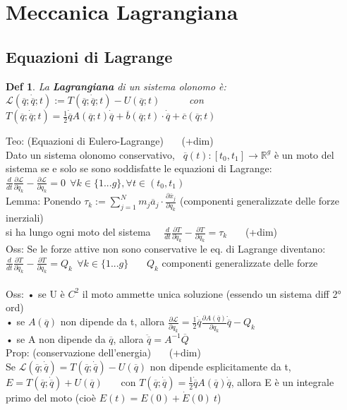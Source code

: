 \documentclass{article}
\theoremstyle{unnumbered}
\newtheorem* {theoremT}{Def}
\theoremstyle{unnumbered1}
\newenvironment{defi}{\begin{gBox}\begin{theoremT}}{\end{theoremT}\end{gBox}}
\begin{document}
\section{Meccanica Lagrangiana}


\subsection{Equazioni di Lagrange}
%
\begin{defi}
La \textbf{Lagrangiana} di un sistema olonomo è:\\
\phantom{DEF: } $\mathcal{L}(\overline{q};\dot{\overline{q}};t):=T(\overline{q};\dot{\overline{q}};t) - U(\overline{q};t)$ \ \ \ \ \ con $T(\overline{q};\dot{\overline{q}};t)=\frac{1}{2}\dot{\overline{q}}A(\overline{q};t)\dot{\overline{q}} + \overline{b}(\overline{q};t)\cdot\dot{\overline{q}} + \overline{c}(\overline{q};t)$
\end{defi}
%
%
Teo: (Equazioni di Eulero-Lagrange) \ \ \ (+dim)\\
Dato un sistema olonomo conservativo, \ $\overline{q}(t):[t_0,t_1]\rightarrow\mathbb{R}^g$ è un moto del sistema se e solo se sono soddisfatte le equazioni di Lagrange:  \ \ \ \ \ $\frac{d}{dt}\frac{\partial\mathcal{L}}{\partial\dot{q}_k} - \frac{\partial\mathcal{L}}{\partial q_k} = 0 \ \ \forall k \in \{1...g\}, \forall t \in (t_0,t_1) $\\
%
Lemma: Ponendo $\tau_k:=\sum_{j=1}^N m_j\overline{a}_j \cdot \frac{\partial \overline{x}_j}{\partial q_k} $ (componenti generalizzate delle forze inerziali)  \\
\phantom{Lemma: } si ha lungo ogni moto del sistema \ \ $\frac{d}{dt}\frac{\partial T}{\partial\dot{q}_k} - \frac{\partial T}{\partial q_k} = \tau_k$  \ \ \ (+dim)\\
%
Oss: Se le forze attive non sono conservative le eq. \! di Lagrange diventano:  \\
\phantom{Oss: }$\frac{d}{dt}\frac{\partial T}{\partial\dot{q}_k} - \frac{\partial T}{\partial q_k} = Q_k \ \ \forall k \in \{1...g\}$ \ \ \ $Q_k$ componenti generalizzate delle forze\\ \\
%
%
%
Oss: • se U è $C^2$ il moto ammette unica soluzione (essendo un sistema diff 2° ord) \\
\phantom{Oss: }• se $A(\overline{q})$ non dipende da t, allora $\frac{\partial\mathcal{L}}{\partial q_k}=\frac{1}{2}\dot{\overline{q}}\frac{\partial A(\overline{q})}{\partial q_k}\dot{\overline{q}}-Q_k$ \\
\phantom{Oss: }• se A non dipende da $\overline{q}$, allora $\ddot{\overline{q}}=A^{-1}\overline{Q}$ \\
%
Prop: (conservazione dell'energia) \ \ \ (+dim)\\
Se $\mathcal{L}(\overline{q};\dot{\overline{q}})=T(\overline{q};\dot{\overline{q}})-U(\overline{q})$ non dipende esplicitamente da t, $E=T(\overline{q};\dot{\overline{q}})+U(\overline{q})$ \ \ \ con $T(\overline{q};\dot{\overline{q}})=\frac{1}{2}\dot{\overline{q}}A(\overline{q})\dot{\overline{q}}$, allora E è un integrale primo del moto   (cioè $E(t)=E(0)+\dot{E}(0) \ t$)
\end{document}
